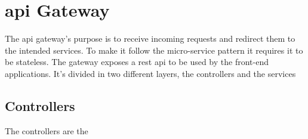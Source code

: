 \chapter{\gls{api} Gateway}
	
	The \gls{api} gateway's purpose is to receive incoming requests and redirect them to the intended services. To make it follow the micro-service pattern it requires it to be stateless.
	The gateway exposes a \gls{rest} \gls{api} to be used by the front-end applications. It's divided in two different layers, the controllers and the services
	
	\section{Controllers}
		The controllers are the 